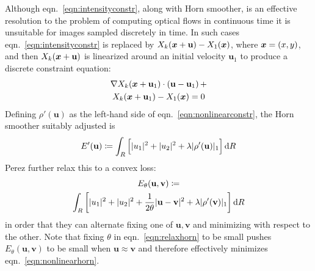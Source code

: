 Although eqn.~\eqref{eqn:intensityconstr}, along with Horn smoother, is an effective resolution to the problem of computing optical flows in continuous time it is unsuitable for images sampled discretely in time.
%
In such cases eqn.~\eqref{eqn:intensityconstr} is replaced by \( X_k(\bm{x} + \mathbf{u}) - X_1(\bm{x})\), where \(\bm{x} = (x,y)\), and then \( X_k(\bm{x} + \mathbf{u})\) is  linearized around an initial velocity \(\mathbf{u}_1\) to produce a discrete constraint equation:
\begin{multline}
	\nabla X_k (\bx + \mathbf{u}_1)\cdot (\mathbf{u} - \mathbf{u}_1)\, + \\ X_k(\bx + \mathbf{u}_1)  -  X_1(\bx) = 0
	\label{eqn:nonlinearconstr}
\end{multline}
Defining \(\rho'(\mathbf{u})\) as the left-hand side of eqn.~\eqref{eqn:nonlinearconstr}, the Horn smoother suitably adjusted is
\begin{equation}
	E'(\mathbf{u}) \coloneqq \int_R \left[ | u_1 |^2 + | u_2 |^2 + \lambda | \rho'(\mathbf{u}) |_1 \right] \dif R
	\label{eqn:nonlinearhorn}
\end{equation}
%
Perez \etal\cite{perez2013tv} further relax this to a convex loss:
\begin{multline}
	E_{\theta}(\mathbf{u}, \mathbf{v}) \coloneqq \\
	\int_R \left[ | u_1 |^2 + | u_2 |^2 + \frac{1}{2\theta}| \mathbf{u} - \mathbf{v} |^2 + \lambda | \rho'(\mathbf{v}) |_1 \right] \dif R
	\label{eqn:relaxhorn}
\end{multline}
in order that they can alternate fixing one of \(\mathbf{u}, \mathbf{v}\) and minimizing with respect to the other.
%
Note that fixing \(\theta\) in eqn.~\eqref{eqn:relaxhorn} to be small pushes \(E_{\theta}(\mathbf{u}, \mathbf{v})\) to be small when \(\mathbf{u}\approx \mathbf{v}\) and therefore effectively minimizes eqn.~\eqref{eqn:nonlinearhorn}.
